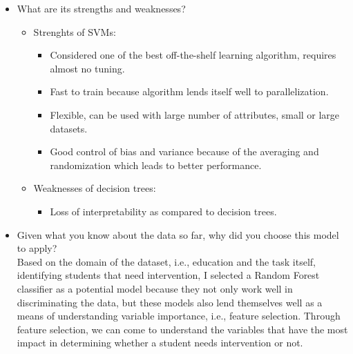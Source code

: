 \documentclass[12pt]{article}
\begin{document}
\begin{itemize}
\item What are its strengths and weaknesses?\\
\begin{itemize}[noitemsep,nolistsep]
       \item Strenghts of SVMs:
              \begin{itemize}[noitemsep,nolistsep]
                     \item Considered one of the best off-the-shelf learning algorithm, requires almost no tuning. 
                     \item Fast to train because algorithm lends itself well to parallelization.
                     \item Flexible, can be used with large number of attributes, small or large datasets.
                     \item Good control of bias and variance because of the averaging and randomization which leads to better performance.
              \end{itemize}
       \item Weaknesses of decision trees:
              \begin{itemize}[noitemsep,nolistsep]
                     \item Loss of interpretability as compared to decision trees.
              \end{itemize}
       \end{itemize}


\item Given what you know about the data so far, why did you choose this model to apply?\\
Based on the domain of the dataset, i.e., education and the task itself, identifying students that need intervention, I selected a Random Forest classifier as a potential model because they not only work well in discriminating the data, but these models also lend themselves well as a means of understanding variable importance, i.e., feature selection. Through feature selection, we can come to understand the variables that have the most impact in determining whether a student needs intervention or not.
\end{itemize} 



\end{document}

